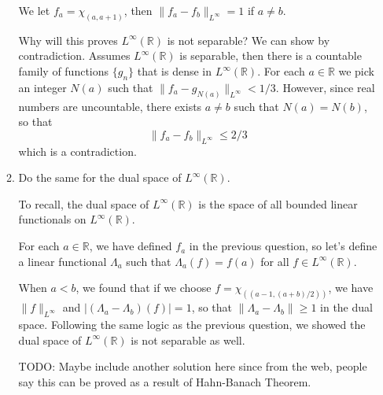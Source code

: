\documentclass{article}
\begin{document}
\begin{enumerate}
\begin{enumerate}
        \begin{solution}
            We let $f_a=\chi_{(a, a+1)}$, then $\|f_a-f_b\|_{L^\infty} = 1$ if $a\neq b$.

            Why will this proves $L^\infty(\mathbb R)$ is not separable? We can show by contradiction.
            Assumes $L^\infty(\mathbb R)$ is separable, then there is a countable family of functions $\{g_n\}$
            that is dense in $L^\infty(\mathbb R)$. 
            For each $a\in\mathbb R$ we pick an integer $N(a)$ such that $\|f_a - g_{N(a)}\|_{L^\infty} < 1/3$.
            However, since real numbers are uncountable, there exists $a\neq b$ such that $N(a)=N(b)$, so that
            $$\|f_a-f_b\|_{L^\infty} \leq 2/3$$
            which is a contradiction.
        \end{solution}

        \item Do the same for the dual space of $L^\infty(\mathbb R)$.

        \begin{solution}
            To recall, the dual space of $L^\infty(\mathbb R)$ is the space of all bounded linear functionals
            on $L^\infty(\mathbb R)$.

            For each $a\in \mathbb R$, we have defined $f_a$ in the previous question, so let's define a linear functional
            $\Lambda_a$ such that $\Lambda_a(f) = f(a)$ for all $f\in L^\infty(\mathbb R)$.

            When $a< b$, we found that if we choose $f=\chi_{((a-1, (a+b)/2))}$, we have $\|f\|_{L^\infty}$ and $|(\Lambda_a-\Lambda_b)(f)| = 1$,
            so that $\|\Lambda_a - \Lambda_b\|\geq 1$ in the dual space. Following the same logic as the previous question, we showed
            the dual space of $L^\infty(\mathbb R)$ is not separable as well.
            
            TODO: Maybe include another solution here since from the web, people say this can be proved as a result of Hahn-Banach Theorem.
        \end{solution}
    \end{enumerate}
\end{enumerate}
\end{document}
